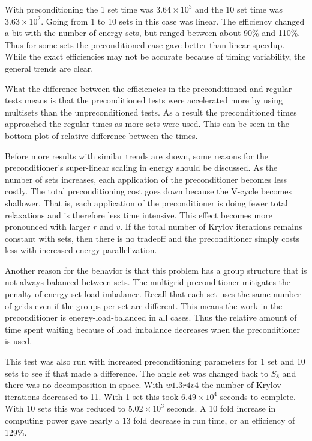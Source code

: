 With preconditioning the 1 set time was $3.64 \times 10^{3}$ and the 10 set time was $3.63 \times 10^{2}$. Going from 1 to 10 sets in this case was linear. The efficiency changed a bit with the number of energy sets, but ranged between about 90\% and 110\%. Thus for some sets the preconditioned case gave better than linear speedup. While the exact efficiencies may not be accurate because of timing variability, the general trends are clear. 

What the difference between the efficiencies in the preconditioned and regular tests means is that the preconditioned tests were accelerated more by using multisets than the unpreconditioned tests. As a result the preconditioned times approached the regular times as more sets were used. This can be seen in the bottom plot of relative difference between the times. 

Before more results with similar trends are shown, some reasons for the preconditioner's super-linear scaling in energy should be discussed. As the number of sets increases, each application of the preconditioner becomes less costly. The total preconditioning cost goes down because the V-cycle becomes shallower. That is, each application of the preconditioner is doing fewer total relaxations and is therefore less time intensive. This effect becomes more pronounced with larger $r$ and $v$. If the total number of Krylov iterations remains constant with sets, then there is no tradeoff and the preconditioner simply costs less with increased energy parallelization.

Another reason for the behavior is that this problem has a group structure that is not always balanced between sets. The multigrid preconditioner mitigates the penalty of energy set load imbalance. Recall that each set uses the same number of grids even if the groups per set are different. This means the work in the preconditioner is energy-load-balanced in all cases. Thus the relative amount of time spent waiting because of load imbalance decreases when the preconditioner is used. 

This test was also run with increased preconditioning parameters for 1 set and 10 sets to see if that made a difference. The angle set was changed back to $S_{8}$ and there was no decomposition in space. With $w1.3r4v4$ the number of Krylov iterations decreased to 11. With 1 set this took $6.49 \times 10^{4}$ seconds to complete. With 10 sets this was reduced to $5.02 \times 10^{3}$ seconds. A 10 fold increase in computing power gave nearly a 13 fold decrease in run time, or an efficiency of 129\%. 

